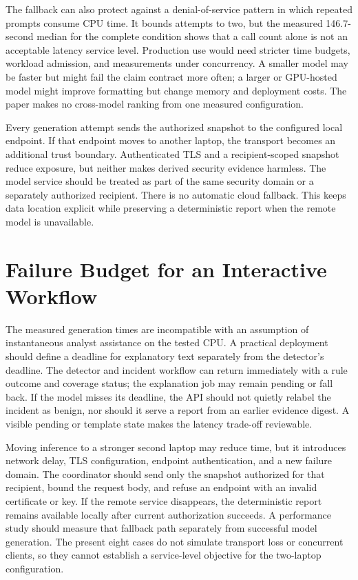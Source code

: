 The fallback can also protect against a denial-of-service pattern in which repeated prompts consume CPU time. It bounds attempts to two, but the measured 146.7-second median for the complete condition shows that a call count alone is not an acceptable latency service level. Production use would need stricter time budgets, workload admission, and measurements under concurrency. A smaller model may be faster but might fail the claim contract more often; a larger or GPU-hosted model might improve formatting but change memory and deployment costs. The paper makes no cross-model ranking from one measured configuration.

Every generation attempt sends the authorized snapshot to the configured local endpoint. If that endpoint moves to another laptop, the transport becomes an additional trust boundary. Authenticated TLS and a recipient-scoped snapshot reduce exposure, but neither makes derived security evidence harmless. The model service should be treated as part of the same security domain or a separately authorized recipient. There is no automatic cloud fallback. This keeps data location explicit while preserving a deterministic report when the remote model is unavailable.

\section{Failure Budget for an Interactive Workflow}
The measured generation times are incompatible with an assumption of instantaneous analyst assistance on the tested CPU. A practical deployment should define a deadline for explanatory text separately from the detector's deadline. The detector and incident workflow can return immediately with a rule outcome and coverage status; the explanation job may remain pending or fall back. If the model misses its deadline, the API should not quietly relabel the incident as benign, nor should it serve a report from an earlier evidence digest. A visible pending or template state makes the latency trade-off reviewable.

Moving inference to a stronger second laptop may reduce time, but it introduces network delay, TLS configuration, endpoint authentication, and a new failure domain. The coordinator should send only the snapshot authorized for that recipient, bound the request body, and refuse an endpoint with an invalid certificate or key. If the remote service disappears, the deterministic report remains available locally after current authorization succeeds. A performance study should measure that fallback path separately from successful model generation. The present eight cases do not simulate transport loss or concurrent clients, so they cannot establish a service-level objective for the two-laptop configuration.
\fi

